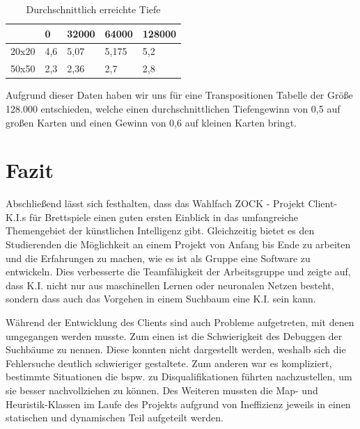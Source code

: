 \documentclass[12pt,a4paper,bibliography=totocnumbered,listof=totocnumbered]{article}
\begin{document}
\begin{table}[!h]
\centering
	\begin{tabular} {| m{1.7cm} | m{3cm} | m{3cm} | m{3cm} | m{3cm}|}
		\hline
		\textbf{} &\textbf{0} &\textbf{32000} & \textbf{64000} & \textbf{128000}\\
		\hline
		20x20 & 4,6 & 5,07 & 5,175 & 5,2 \\
		\hline
		50x50 & 2,3 & 2,36 & 2,7 & 2,8 \\
		\hline
	\end{tabular}
	\caption{Durchschnittlich erreichte Tiefe}
	\label{tab:tasks}
\end{table}

Aufgrund dieser Daten haben wir uns für eine Transpositionen Tabelle der Größe 128.000 entschieden, welche einen durchschnittlichen Tiefengewinn von 0,5 auf großen Karten und einen Gewinn von 0,6 auf kleinen Karten bringt.



\newpage
\section{Fazit}
Abschließend lässt sich festhalten, dass das Wahlfach \glqq ZOCK - Projekt Client-K.I.s für Brettspiele\grqq{} einen guten ersten Einblick in das umfangreiche Themengebiet der künstlichen Intelligenz gibt. Gleichzeitig bietet es den Studierenden die Möglichkeit an einem Projekt von Anfang bis Ende zu arbeiten und die Erfahrungen zu machen, wie es ist als Gruppe eine Software zu entwickeln. Dies verbesserte die Teamfähigkeit der Arbeitsgruppe und zeigte auf, dass K.I. nicht nur aus maschinellen Lernen oder neuronalen Netzen besteht, sondern dass auch das Vorgehen in einem Suchbaum eine K.I. sein kann.

Während der Entwicklung des Clients sind auch Probleme aufgetreten, mit denen umgegangen werden musste. Zum einen ist die Schwierigkeit des Debuggen der Suchbäume zu nennen. Diese konnten nicht dargestellt werden, weshalb sich die Fehlersuche deutlich schwieriger gestaltete. Zum anderen war es kompliziert, bestimmte Situationen die bspw. zu Disqualifikationen führten nachzustellen, um sie besser nachvollziehen zu können. Des Weiteren mussten die Map- und Heuristik-Klassen im Laufe des Projekts aufgrund von Ineffizienz jeweils in einen statischen und dynamischen Teil aufgeteilt werden.
\end{document}
